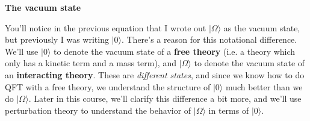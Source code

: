 \documentclass[12pt, oneside]{article}   	%
\theoremstyle{definition}
\begin{document}
\begin{itemize}
\begin{answerbox}
	{\centering \textbf{The vacuum state} } \\
	
	\raggedright
	You'll notice in the previous equation that I wrote out $|\Omega\rangle$ as the vacuum state, but previously I was writing $|0\rangle$. There's a reason for this notational difference. We'll use $|0\rangle$ to denote the vacuum state of a \textbf{free theory} (i.e. a theory which only has a kinetic term and a mass term), and $|\Omega\rangle$ to denote the vacuum state of an \textbf{interacting theory}. These are \textit{different states}, and since we know how to do QFT with a free theory, we understand the structure of $|0\rangle$ much better than we do $|\Omega\rangle$. Later in this course, we'll clarify this difference a bit more, and we'll use perturbation theory to understand the behavior of $|\Omega\rangle$ in terms of $|0\rangle$. 
\end{answerbox}
	
\end{itemize}
\end{document}
